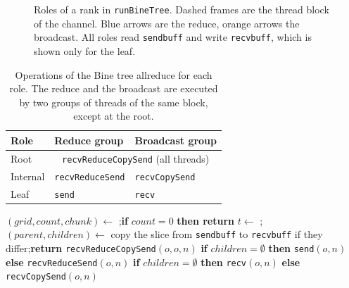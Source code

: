 \begin{figure}[t]
{}
  \caption{Roles of a rank in \texttt{runBineTree}. Dashed frames are the thread block
           of the channel. Blue arrows are the reduce, orange arrows the broadcast.
           All roles read \texttt{sendbuff} and write \texttt{recvbuff}, which is
           shown only for the leaf.}
  \label{fig:tar-roles}
\end{figure}
\begin{table}[t]
\centering
\small
\caption{Operations of the Bine tree allreduce for each role. The reduce and the broadcast are executed by two groups of threads of the same block, except at the root.}
\label{tab:tar-calls}
\begin{tabular}{@{}lll@{}}
\toprule
Role & Reduce group & Broadcast group \\
\midrule
Root     & \multicolumn{2}{c}{\texttt{recvReduceCopySend} (all threads)} \\
Internal & \texttt{recvReduceSend} & \texttt{recvCopySend} \\
Leaf     & \texttt{send}           & \texttt{recv} \\
\bottomrule
\end{tabular}
\end{table}
\begin{algorithm}[t]
\caption{Bine tree allreduce (\texttt{runBineTree}, one block per channel).}
\label{alg:tar}
\begin{algorithmic}[1]
\State $(\mathit{grid},\mathit{count},\mathit{chunk}) \gets$ ;\quad \textbf{if} $\mathit{count}=0$ \textbf{then return}
\State $t \gets$ ;\quad $(\mathit{parent},\mathit{children}) \gets$ 
  \State copy the slice from \texttt{sendbuff} to \texttt{recvbuff} if they differ;\quad \textbf{return}
\EndIf
{}
    \State \texttt{recvReduceCopySend}$(o,o,n)$
  \EndFor
{}
    \State \textbf{if} $\mathit{children}=\emptyset$ \textbf{then} \texttt{send}$(o,n)$ \textbf{else} \texttt{recvReduceSend}$(o,n)$
  \EndFor
\Else{}
    \State \textbf{if} $\mathit{children}=\emptyset$ \textbf{then} \texttt{recv}$(o,n)$ \textbf{else} \texttt{recvCopySend}$(o,n)$
  \EndFor
\EndIf
\end{algorithmic}
\end{algorithm}
